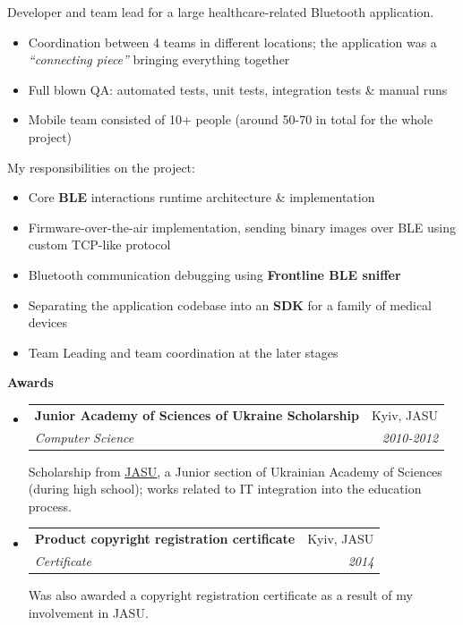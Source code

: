 \documentclass[letterpaper,11pt]{article}
\makeatletter
\newcommand{\resitem}[1]{\item #1 \vspace{-2pt}}
\newcommand{\resheading}[1]{{\vspace{.2in} \large \colorbox{title_bg}{\begin{minipage}{\textwidth}{\textbf{#1 \vphantom{p\^{E}}}}\end{minipage}}}}
\newcommand{\ressubheading}[4]{
\begin{tabular*}{7.1in}{l@{\extracolsep{\fill}}r}
		\textbf{#1} & #2 \\
		\textit{#3} & \textit{#4} \\
\end{tabular*}\vspace{-6pt}}
\makeatother
\begin{document}
\begin{itemize}
		Developer and team lead for a large healthcare-related Bluetooth application.
		\begin{itemize}
				\resitem{Coordination between 4 teams in different locations; the application was a \textit{``connecting piece''} bringing everything together}
				\resitem{Full blown QA: automated tests, unit tests, integration tests \& manual runs}
				\resitem{Mobile team consisted of 10+ people (around 50-70 in total for the whole project)}
		\end{itemize}

		My responsibilities on the project:
		\begin{itemize}
				\resitem{Core \textbf{BLE} interactions runtime architecture \& implementation}
				\resitem{Firmware-over-the-air implementation, sending binary images over BLE using custom TCP-like protocol}
				\resitem{Bluetooth communication debugging using \textbf{Frontline BLE sniffer}}
				\resitem{Separating the application codebase into an \textbf{SDK} for a family of medical devices}
				\resitem{Team Leading and team coordination at the later stages}
		\end{itemize}
\end{itemize}

\resheading{Awards}
\begin{itemize}
	\item
		\ressubheading{Junior Academy of Sciences of Ukraine Scholarship}{Kyiv, JASU}{Computer Science}{2010-2012}

		Scholarship from \href{http://man.gov.ua/en}{\textcolor{link_fg}{\underline{JASU}}}, a Junior section of Ukrainian Academy of Sciences (during high school); works related to IT integration into the education process.
	\item
		\ressubheading{Product copyright registration certificate}{Kyiv, JASU}{Certificate \textnumero40491}{2014}

		Was also awarded a copyright registration certificate as a result of my involvement in JASU.
\end{itemize}
\end{document}
